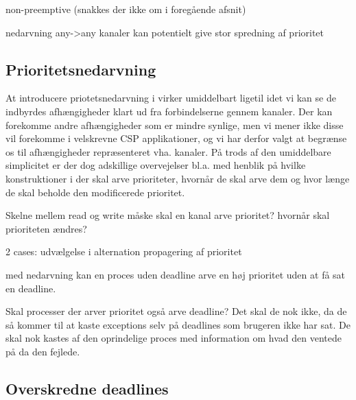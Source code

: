 non-preemptive (snakkes der ikke om i foregående afsnit)

nedarvning 
  any->any kanaler kan potentielt give stor spredning af prioritet

\subsection{Prioritetsnedarvning}
At introducere priotetsnedarvning i \pycsp virker umiddelbart ligetil idet vi kan se de indbyrdes afhængigheder klart ud fra forbindelserne gennem kanaler. Der kan forekomme andre afhængigheder som er mindre synlige, men vi mener ikke disse vil forekomme i velskrevne CSP applikationer, og vi har derfor valgt at begrænse os til afhængigheder repræsenteret vha. kanaler. På trods af den umiddelbare simplicitet er der dog adskillige overvejelser bl.a. med henblik på hvilke konstruktioner i \pycsp der skal arve prioriteter, hvornår de skal arve dem og hvor længe de skal beholde den modificerede prioritet. 





Skelne mellem read og write
måske skal en kanal arve prioritet?
hvornår skal prioriteten ændres? 

2 cases:
udvælgelse i alternation
propagering af prioritet

med nedarvning kan en proces uden deadline arve en høj prioritet uden at få sat en deadline. 

Skal processer der arver prioritet også arve deadline? Det skal de nok ikke, da de så kommer til at kaste exceptions selv på deadlines som brugeren ikke har sat. De skal nok kastes af den oprindelige proces med information om hvad den ventede på da den fejlede. 

\subsection{Overskredne deadlines}


